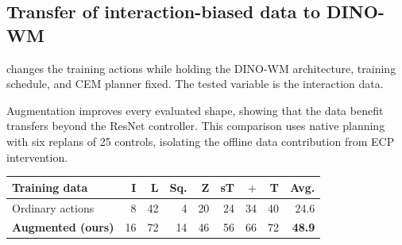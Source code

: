 \begin{table}[!t]
\begin{minipage}[t]{\columnwidth}
\subsection{Transfer of interaction-biased data to DINO-WM}
\label{sec:dinowm}
 changes the training actions while holding the DINO-WM architecture, training schedule, and CEM planner fixed. The tested variable is the interaction data.\par\smallskip
\normalsize
Augmentation improves every evaluated shape, showing that the data benefit transfers beyond the ResNet controller. This comparison uses native planning with six replans of 25 controls, isolating the offline data contribution from ECP intervention.\par
\end{minipage}\hfill
\begin{minipage}[t]{\columnwidth}
\vspace{0pt}
\par\smallskip
{\centering
\centering
{}
\label{tab:dinowm-aug}
\small
\setlength{\tabcolsep}{3.4pt}
\begin{tabular}{lrrrrrrrr}
\toprule
Training data & I & L & Sq. & Z & sT & $+$ & T & Avg.\\
\midrule
Ordinary actions &8&42&4&20&24&34&40&24.6\\
\textbf{Augmented (ours)} &16&72&14&46&56&66&72&\textbf{48.9}\\
\bottomrule
\end{tabular}
\par}
\end{minipage}\par

\end{table}
\clearpage
